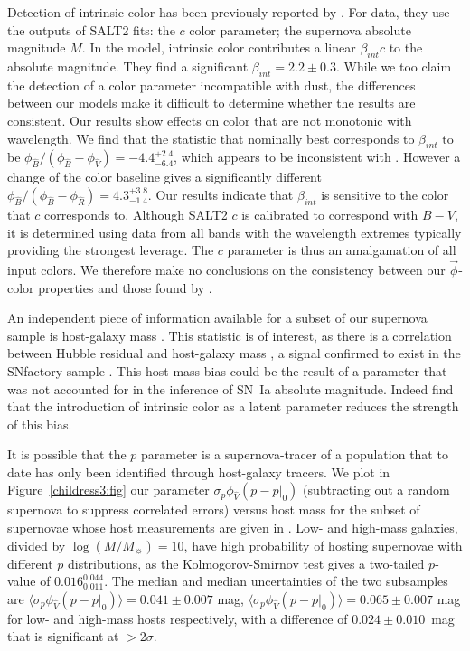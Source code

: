 \documentclass[trackchanges]{aastex62}   	%
\begin{document}
Detection of intrinsic color has been previously reported by .
For data, they use the outputs of SALT2 fits: the $c$ color parameter;
the
supernova absolute magnitude $M$.
In the 
model, intrinsic color contributes a linear   $\beta_{\mathit{int}} c$ to  the absolute
magnitude.
They find a significant $\beta_{\mathit{int}} = 2.2\pm 0.3$.
While we too claim the detection of a color parameter incompatible with dust,
the differences between our models make it
difficult to determine whether the results are consistent.   Our results show effects on color that are not monotonic
with wavelength.  We find that the statistic that nominally best corresponds to  $\beta_{\mathit{int}}$
to be
$\phi_{\hat{B}}/(\phi_{\hat{B}}-\phi_{\hat{V}}) =-4.4_{  -6.4}^{+   2.4}$, which appears to be inconsistent with  .  
However a change of the color baseline gives a significantly different
$\phi_{\hat{B}}/(\phi_{\hat{B}}-\phi_{\hat{R}}) =4.3_{  -1.4}^{+   3.8}$.  Our results indicate that  $\beta_{\mathit{int}}$
is sensitive to the color that $c$ corresponds to.  Although SALT2 $c$ is calibrated to correspond with $B-V$, it is
determined using data from all bands with the wavelength extremes  typically providing the strongest leverage.
The $c$ parameter is thus an  amalgamation of all input colors.
We therefore make no conclusions on the consistency between our $\vec{\phi}$-color properties
and those found by .


An independent piece of information available for a subset of our supernova sample is host-galaxy mass \citep{2013ApJ...770..108C}.  
This statistic is of interest, as there is a correlation between Hubble residual and host-galaxy mass
\citep[first noted by][]{2010ApJ...715..743K,2010MNRAS.406..782S}, a signal confirmed to exist in the SNfactory
sample \citep{2013ApJ...770..108C}.
This host-mass bias could be the result of a parameter that was not accounted for in the inference of SN~Ia absolute magnitude.
Indeed   find that the  introduction of intrinsic color as a latent parameter
reduces the strength of  this bias.

It is possible that the  $p$ parameter is a supernova-tracer of a population that to date has only been identified through host-galaxy tracers.
We plot in Figure~\ref{childress3:fig} our parameter
 $\sigma_p\phi_{\hat{V}}(p-p|_0) $  (subtracting out a random supernova
to suppress correlated errors) versus host mass
for the subset of supernovae whose host measurements are given in \citet{2013ApJ...770..108C}.
Low- and high-mass galaxies, divided by $\log{(M/M_\sun)}=10$, have high probability of hosting supernovae with different $p$ distributions, as
the Kolmogorov-Smirnov test gives a two-tailed $p$-value of $  0.016 _ {     0.011 } ^{     0.044 }$.
The median and median uncertainties of the two subsamples are
$\langle \sigma_p\phi_{\hat{V}}(p-p|_0) \rangle=  0.041 \pm {     0.007 }$ mag,
$\langle \sigma_p\phi_{\hat{V}}(p-p|_0)  \rangle=0.065 \pm {     0.007 }$ mag
for low- and high-mass hosts respectively, with a difference of $ 0.024 \pm {     0.010 }$~mag that is significant at $>2 \sigma$.
\end{document}
